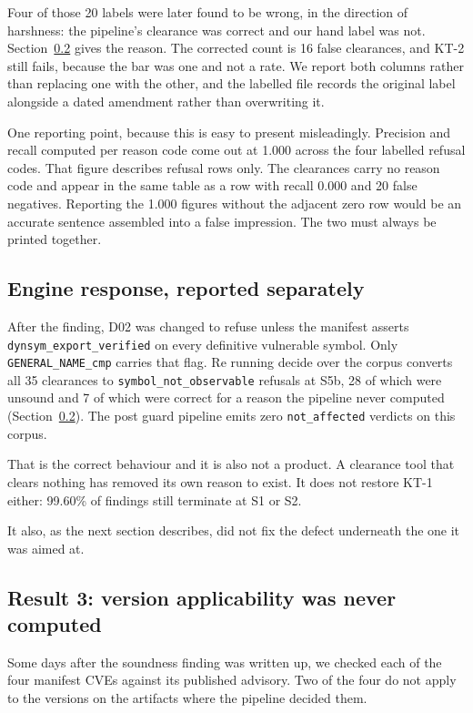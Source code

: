 Four of those 20 labels were later found to be wrong, in the direction of
harshness: the pipeline's clearance was correct and our hand label was not.
Section~\ref{sec:version} gives the reason. The corrected count is 16 false
clearances, and KT-2 still fails, because the bar was one and not a rate. We
report both columns rather than replacing one with the other, and the labelled
file records the original label alongside a dated amendment rather than
overwriting it.

One reporting point, because this is easy to present misleadingly. Precision and
recall computed per reason code come out at 1.000 across the four labelled
refusal codes. That figure describes refusal rows only. The clearances carry no
reason code and appear in the same table as a row with recall 0.000 and 20 false
negatives. Reporting the 1.000 figures without the adjacent zero row would be an
accurate sentence assembled into a false impression. The two must always be
printed together.

\subsection{Engine response, reported separately}

After the finding, D02 was changed to refuse unless the manifest asserts
\texttt{dynsym\_export\_verified} on every definitive vulnerable symbol. Only
\texttt{GENERAL\_NAME\_cmp} carries that flag. Re running decide over the corpus
converts all 35 clearances to \texttt{symbol\_not\_observable} refusals at S5b,
28 of which were unsound and 7 of which were correct for a reason the pipeline
never computed (Section~\ref{sec:version}).
The post guard pipeline emits zero \texttt{not\_affected} verdicts on this
corpus.

That is the correct behaviour and it is also not a product. A clearance tool that
clears nothing has removed its own reason to exist. It does not restore KT-1
either: 99.60\% of findings still terminate at S1 or S2.

It also, as the next section describes, did not fix the defect underneath the
one it was aimed at.

\subsection{Result 3: version applicability was never computed}
\label{sec:version}

Some days after the soundness finding was written up, we checked each of the
four manifest CVEs against its published advisory. Two of the four do not apply
to the versions on the artifacts where the pipeline decided them.

